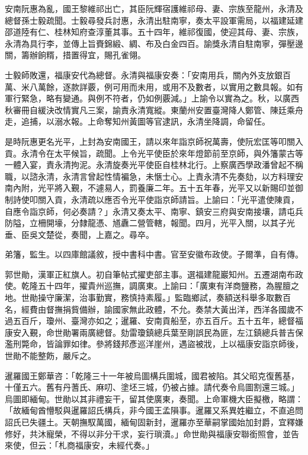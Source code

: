 \begin{pinyinscope}
安南阮惠為亂，國王黎維祁出亡，其臣阮輝宿護維祁母、妻、宗族至龍州，永清及總督孫士毅疏聞。士毅尋發兵討惠，永清出駐南寧，奏太平設軍需局，以福建延建邵道陸有仁、桂林知府查淳董其事。五十四年，維祁復國，使迎其母、妻、宗族，永清為具行李，並傳上旨賚錦緞、綢、布及白金四百。諭獎永清自駐南寧，彈壓邊關，籌辦餉糈，措置得宜，賜孔雀翎。

士毅師敗還，福康安代為總督。永清與福康安奏：「安南用兵，關內外支放銀百萬、米八萬餘，逐款詳覈，例可用而未用，或用不及數者，以實用之數具報。如有軍行緊急，略有變通。與例不符者，仍如例覈減。」上諭令以實為之。秋，以廣西秋審冊自緩決改情實凡三案，諭責永清寬縱。東蘭州安置臺灣降人鄭管、陳廷乘舟走，追捕，以溺水報。上命奪知州黃圖等官逮訊，永清坐降調，命留任。

是時阮惠更名光平，上封為安南國王，請以來年詣京師祝萬壽，使阮宏匡等叩關入貢。永清令在太平候旨，疏聞。上令光平使臣於來年燈節前至京師，與外籓蒙古等一體入宴，責永清拘泥。永清旋奏光平使臣自桂林北行。上察廣西學政潘曾起不稱職，以諮永清，永清言曾起性情褊急，未愜士心。上責永清不先奏劾，以方料理安南內附，光平將入覲，不遽易人，罰養廉二年。五十五年春，光平又以新賜印並御制詩使叩關入貢，永清疏以應否令光平使詣京師請旨。上諭曰：「光平遣使陳貢，自應令詣京師，何必奏請？」永清又奏太平、南寧、鎮安三府與安南接壤，請屯兵防隘，立柵開壕，分隸龍憑、馗纛二營管轄，報聞。四月，光平入關，以其子光垂、臣吳文楚從，奏聞，上嘉之。尋卒。

弟籓，監生。以四庫館議敘，授中書科中書。官至安徽布政使。子爾準，自有傳。

郭世勛，漢軍正紅旗人。初自筆帖式擢吏部主事。選福建龍巖知州。五遷湖南布政使。乾隆五十四年，擢貴州巡撫，調廣東。上諭曰：「廣東有洋商鹽務，為腥膻之地。世勛操守廉潔，治事勤實，務慎持素履。」監臨鄉試，奏額送科舉多取數百名，經費由督撫捐貲備辦，諭國家無此政體，不允。奏禁大黃出洋，西洋各國歲不過五百斤，瓊州、臺灣亦如之；暹羅、安南貢船至，亦五百斤。五十五年，總督福康安入覲，命世勛署兩廣總督。劾雷瓊鎮總兵葉至剛誤民為匪，左江鎮總兵普吉保濫刑斃命，皆論罪如律。參將錢邦彥巡洋崖州，遇盜被戕，上以福康安詣京師後，世勛不能整飭，嚴斥之。

暹羅國王鄭華咨：「乾隆三十一年被烏圖構兵圍城，國君被陷。其父昭克復舊基，十僅五六。舊有丹蓍氏、麻叨、塗坯三城，仍被占據。請代奏令烏圖割還三城。」烏圖即緬甸。世勛以其非禮妄干，留其使廣東，奏聞。上命軍機大臣擬檄，略謂：「故緬甸酋懵駁與暹羅詔氏構兵，非今國王孟隕事。暹羅又系異姓繼立，不直追問詔氏已失疆土。天朝撫馭萬國，緬甸固新封，暹羅亦至華嗣掌國始加封爵，宜釋嫌修好，共沐寵榮，不得以非分干求，妄行瑣瀆。」命世勛與福康安聯銜照會，並告來使，但云：「札商福康安，未經代奏。」


\end{pinyinscope}
